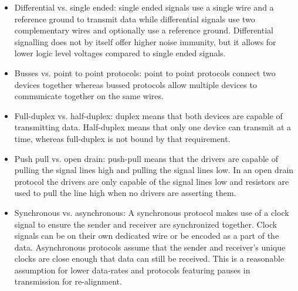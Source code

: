 \documentclass[main.tex]{subfiles}
\begin{document}
\begin{itemize}
    \item Differential vs. single ended: single ended signals use a single wire and a reference ground to transmit data while differential signals use two complementary wires and optionally use a reference ground. Differential signalling does not by itself offer higher noise immunity, but it allows for lower logic level voltages compared to single ended signals. 
    \item Busses vs. point to point protocols: point to point protocols connect two devices together whereas bussed protocols allow multiple devices to communicate together on the same wires. 
    \item Full-duplex vs. half-duplex: duplex means that both devices are capable of transmitting data. Half-duplex means that only one device can transmit at a time, whereas full-duplex is not bound by that requirement. 
    \item Push pull vs. open drain: push-pull means that the drivers are capable of pulling the signal lines high and pulling the signal lines low. In an  open drain protocol the drivers are only capable of the signal lines low and resistors are used to pull the line high when no drivers are asserting them.
    \item Synchronous vs. asynchronous: A synchronous protocol makes use of a clock signal to ensure the sender and receiver are synchronized together. Clock signals can be on their own dedicated wire or be encoded as a part of the data. Asynchronous protocols assume that the sender and receiver's unique clocks are close enough that data can still be received. This is a reasonable assumption for lower data-rates and protocols featuring pauses in transmission for re-alignment.
\end{itemize}
\end{document}
